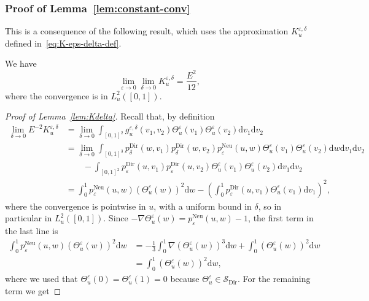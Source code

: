 \documentclass[AHL,Unicode,longabstracts]{cedram}
\DeclareMathOperator{\Dir}{Dir}
\DeclareMathOperator{\Neu}{Neu}
\newcommand{\mc}[1]{{\mathcal #1}}
\renewcommand{\mc}[1]{{\mathcal #1}}
\newcommand{\SD}{\ensuremath{\mc S_{\Dir}}}
\newcommand*{\dd}{\mathrm{d}}
\newcommand*{\dv}{\dd v}
\newcommand*{\dw}{\dd w}
\begin{document}
\subsubsection{Proof of Lemma~\ref{lem:constant-conv}}

This is a consequence of the following result, which uses the approximation $K_u^{\varepsilon,\delta}$ defined in~\eqref{eq:K-eps-delta-def}.

\begin{lemm}\label{lem:Kdelta}
We have
\[
\lim_{\varepsilon \rightarrow 0} \lim_{\delta \rightarrow 0} K^{\varepsilon, \delta}_u = \frac{E^2}{12},
\]
where the convergence is in $L_u^2 ([0, 1])$.
\end{lemm}

\begin{proof}[Proof of Lemma~\ref{lem:Kdelta}]
Recall that, by definition
\begin{align*}
\lim_{\delta \rightarrow 0} E^{- 2} K^{\varepsilon, \delta}_u & =
\lim_{\delta \rightarrow 0} \int_{[0, 1]^2} g^{\varepsilon, \delta}_u (v_1, v_2) \Theta^{\varepsilon}_u (v_1) \Theta^{\varepsilon}_u (v_2) \dv_1 \dv_2\\
& = \lim_{\delta \rightarrow 0} \int_{[0, 1]^3} p^{\Dir}_{\delta} (w, v_1) p^{\Dir}_{\delta} (w, v_2) p^{\Neu}_{\varepsilon} (u, w) \Theta^{\varepsilon}_u (v_1) \Theta^{\varepsilon}_u (v_2) \dw \dv_1 \dv_2\\
&\qquad - \int_{[0, 1]^2} p^{\Dir}_{\varepsilon} (u, v_1) p^{\Dir}_{\varepsilon} (u, v_2)
\Theta^{\varepsilon}_u (v_1) \Theta^{\varepsilon}_u (v_2) \dv_1 \dv_2\\
& = \int_0^1 p^{\Neu}_{\varepsilon} (u, w) (\Theta^{\varepsilon}_u (w))^2 \dw - \left(\int_0^1 p^{\Dir}_{\varepsilon} (u, v_1) \Theta^{\varepsilon}_u (v_1) \dv_1 \right)^2,
\end{align*}
where the convergence is pointwise in $u$, with a uniform bound in $\delta$, so in particular in $L_u^2 ([0, 1])$. Since $- \nabla
\Theta^{\varepsilon}_u (w) = p^{\Neu}_{\varepsilon} (u, w) - 1$, the first term in the last line is
\begin{align*}
\int_0^1 p^{\Neu}_{\varepsilon} (u, w) (\Theta^{\varepsilon}_u (w))^2 \dw& =
- \frac{1}{3} \int_0^1 \nabla (\Theta^{\varepsilon}_u (w))^3 \dw +
\int_0^1 (\Theta^{\varepsilon}_u (w))^2 \dw \\ & = \int_0^1 (\Theta^{\varepsilon}_u (w))^2 \dw,
\end{align*}
where we used that $\Theta^{\varepsilon}_u (0) = \Theta^{\varepsilon}_u (1) = 0$ because $\Theta^\varepsilon_u \in \SD$. For the remaining term we get

\end{proof}
\end{document}
